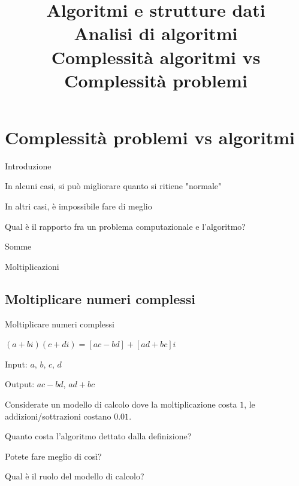 

\title[ASD - Analisi di algoritmi]{\textbf{Algoritmi e strutture dati}\\[24pt]Analisi di algoritmi\\Complessità algoritmi vs Complessità problemi}

\FrameTitle{}

\section{Complessità problemi vs algoritmi}


\begin{frame}{Introduzione}

\BI
\item In alcuni casi, si può migliorare quanto si ritiene "normale"
\item In altri casi, è impossibile fare di meglio
\item Qual è il rapporto fra un problema computazionale e l'algoritmo?
\EI

\bigskip
{}
\BI
\item Somme 
\item Moltiplicazioni
\EI


\end{frame}

\subsection{Moltiplicare numeri complessi}


\begin{frame}{Moltiplicare numeri complessi}

\begin{myboxtitle}
\BI
\item $(a + bi)(c + di) = [ac-bd] + [ad + bc] i$
\item Input: $a$, $b$, $c$, $d$
\item Output: $ac-bd$, $ad+bc$
\EI
\end{myboxtitle}

\begin{myboxtitle}[Domande]
Considerate un modello di calcolo dove la moltiplicazione costa $1$, le addizioni/sottrazioni costano $0.01$.
\BI
\item Quanto costa l'algoritmo dettato dalla definizione?
\item Potete fare meglio di così? 
\item Qual è il ruolo del modello di calcolo?
\EI
\end{myboxtitle}	

\end{frame}

